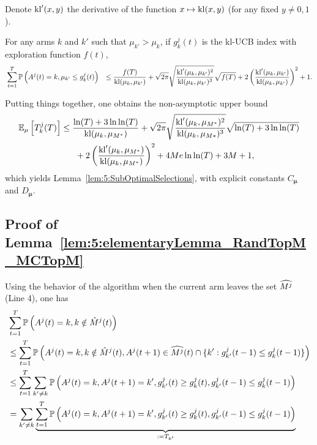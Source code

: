 Denote $\mathrm{kl}'(x,y)$ the derivative of the function $x \mapsto \mathrm{kl}(x,y)$ (for any fixed $y\neq 0, 1$).

\begin{lemma}\label{lem:5:Fact2KLUCB} For any arms $k$ and $k'$ such that $\mu_{k'} > \mu_{k}$, if $g_k^{j}(t)$ is the kl-UCB index with exploration function $f(t)$,
\begin{align*}
  &\sum_{t=1}^T\mathbb{P}\left( A^j(t) = k, \mu_{k'} \leq g_k^{j}(t) \right) & \leq  \frac{f(T)}{\mathrm{kl}(\mu_k,\mu_{k'})}
  + \sqrt{2\pi} \sqrt{\frac{\mathrm{kl}'(\mu_k,\mu_{k'})^2}{\mathrm{kl}(\mu_k,\mu_{k'})^3}}\sqrt{f(T)} + 2\left(\frac{\mathrm{kl}'(\mu_k,\mu_{k'})}{\mathrm{kl}(\mu_k,\mu_{k'})}\right)^2 + 1.\end{align*}
\end{lemma}

Putting things together, one obtains the non-asymptotic upper bound
\begin{align}\label{eq:5:UBprecise}
  \mathbb{E}_{\mu}\left[T_k^j(T)\right]
  & \leq \frac{\ln(T) + 3 \ln\ln(T)}{\mathrm{kl}(\mu_k,\mu_{M^*})} + \sqrt{2\pi} \sqrt{\frac{\mathrm{kl}'(\mu_k,\mu_{M^*})^2}{\mathrm{kl}(\mu_k,\mu_{M*})^3}}\sqrt{\ln(T) + 3\ln\ln(T)}  \nonumber\\
  & \;\;\;\;\;\;+ 2\left(\frac{\mathrm{kl}'(\mu_k,\mu_{M^*})}{\mathrm{kl}(\mu_k,\mu_{M^*})}\right)^2 + 4Me \ln\ln(T) + 3M+1,
\end{align}
which yields Lemma~\ref{lem:5:SubOptimalSelections},
with explicit constants $C_{\boldsymbol{\mu}}$ and $D_{\boldsymbol{\mu}}$.



\subsection{Proof of Lemma~\ref{lem:5:elementaryLemma_RandTopM_MCTopM}}\label{proof:5:elementaryLemma_RandTopM_MCTopM}

Using the behavior of the algorithm when the current arm leaves the set $\widehat{M^j}$ (Line 4), one has
\begin{align*}
  & \sum_{t=1}^T \mathbb{P}\left(A^j(t) = k, k \notin \hat{M}^j(t)\right)  \\ & \leq \sum_{t=1}^T \mathbb{P}\left(A^j(t) = k, k \notin \hat{M}^j(t), A^j(t+1) \in \widehat{M^j}(t) \cap \{k': g_{k'}^j(t-1) \leq g_k^j(t-1)\}\right) \\
  & \leq   \sum_{t=1}^T \sum_{k' \neq k}\mathbb{P}\left(A^j(t) = k,A^j(t+1) = k', g_{k'}^j(t) \geq g_{k}^j(t), g_{k'}^j(t-1) \leq g_{k}^j(t-1)  \right) \\
  & = \sum_{k' \neq k} \underbrace{\sum_{t=1}^T \mathbb{P}\left(A^j(t) = k,A^j(t+1) = k', g_{k'}^j(t) \geq g_{k}^j(t), g_{k'}^j(t-1) \leq g_{k}^j(t-1)  \right)}_{:= T_{k'}}
\end{align*}


